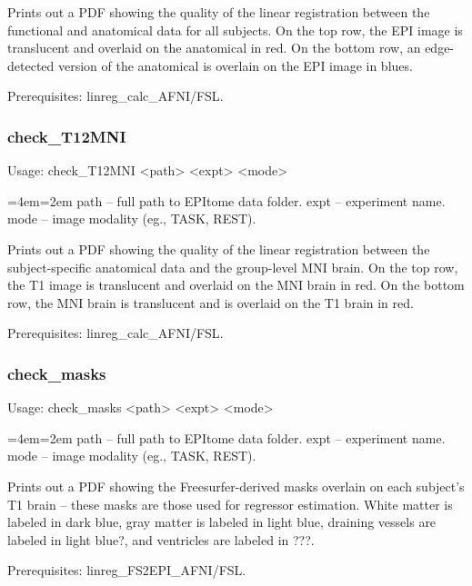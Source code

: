 \documentclass[final,titlepage,letterpaper,oneside,12pt]{article}
\renewcommand{\texttt}[2][BrickRed]{\textcolor{#1}{\ttfamily #2}}%
\newenvironment{blockquote}{%
  \par%
  \medskip
  \leftskip=4em\rightskip=2em%
  \noindent\ignorespaces}{%
  \par\medskip}
\begin{document}
\noindent Prints out a PDF showing the quality of the linear registration between the functional and anatomical data for all subjects. On the top row, the EPI image is translucent and overlaid on the anatomical in red. On the bottom row, an edge-detected version of the anatomical is overlain on the EPI image in blues.

Prerequisites: \texttt{linreg\_calc\_AFNI/FSL}.

\subsubsection{check\_T12MNI}
Usage: \texttt{check\_T12MNI <path> <expt> <mode>}

\begin{blockquote}
path -- full path to EPItome data folder.
expt -- experiment name.
mode -- image modality (eg., TASK, REST).
\end{blockquote}

\noindent Prints out a PDF showing the quality of the linear registration between the subject-specific anatomical data and the group-level MNI brain. On the top row, the T1 image is translucent and overlaid on the MNI brain in red. On the bottom row, the MNI brain is translucent and is overlaid on the T1 brain in red.

Prerequisites: \texttt{linreg\_calc\_AFNI/FSL}.

\subsubsection{check\_masks}
Usage: \texttt{check\_masks <path> <expt> <mode>}

\begin{blockquote}
path -- full path to EPItome data folder.
expt -- experiment name.
mode -- image modality (eg., TASK, REST).
\end{blockquote}

\noindent Prints out a PDF showing the Freesurfer-derived masks overlain on each subject's T1 brain -- these masks are those used for regressor estimation. White matter is labeled in dark blue, gray matter is labeled in light blue, draining vessels are labeled in light blue?, and ventricles are labeled in ???.  

Prerequisites: \texttt{linreg\_FS2EPI\_AFNI/FSL}.
\end{document}
